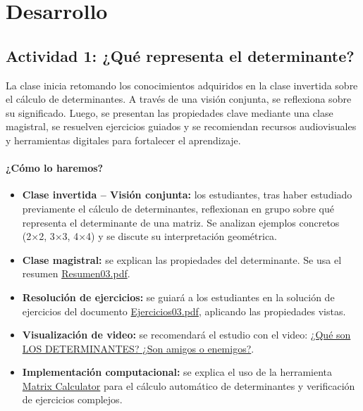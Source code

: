 \documentclass[a4,11pt]{aleph-notas}
\begin{document}
\section*{Desarrollo}  

\subsection*{Actividad 1: ¿Qué representa el determinante?}  

La clase inicia retomando los conocimientos adquiridos en la clase invertida sobre el cálculo de determinantes. A través de una visión conjunta, se reflexiona sobre su significado. Luego, se presentan las propiedades clave mediante una clase magistral, se resuelven ejercicios guiados y se recomiendan recursos audiovisuales y herramientas digitales para fortalecer el aprendizaje.

\paragraph{¿Cómo lo haremos?}  
\begin{itemize}[leftmargin=*]  
    \item \textbf{Clase invertida – Visión conjunta:} los estudiantes, tras haber estudiado previamente el cálculo de determinantes, reflexionan en grupo sobre qué representa el determinante de una matriz. Se analizan ejemplos concretos (2×2, 3×3, 4×4) y se discute su interpretación geométrica.  
    \item \textbf{Clase magistral:} se explican las propiedades del determinante. Se usa el resumen \href{https://fcena-puce.github.io/AlgLinealyGeomAnalitica-05-N0068/2-Resumenes/Resumen03.pdf}{Resumen03.pdf}.  
    \item \textbf{Resolución de ejercicios:} se guiará a los estudiantes en la solución de ejercicios del documento \href{https://fcena-puce.github.io/AlgLinealyGeomAnalitica-05-N0068/2-Ejercicios/Ejercicios03.pdf}{Ejercicios03.pdf}, aplicando las propiedades vistas.  
    \item \textbf{Visualización de video:} se recomendará el estudio con el video: \href{https://www.youtube.com/watch?v=Bd7XboIfsU4}{¿Qué son LOS DETERMINANTES? ¿Son amigos o enemigos?}.  
    \item \textbf{Implementación computacional:} se explica el uso de la herramienta \href{https://matrixcalc.org/es/slu.html}{Matrix Calculator} para el cálculo automático de determinantes y verificación de ejercicios complejos.  
\end{itemize}  
\end{document}
